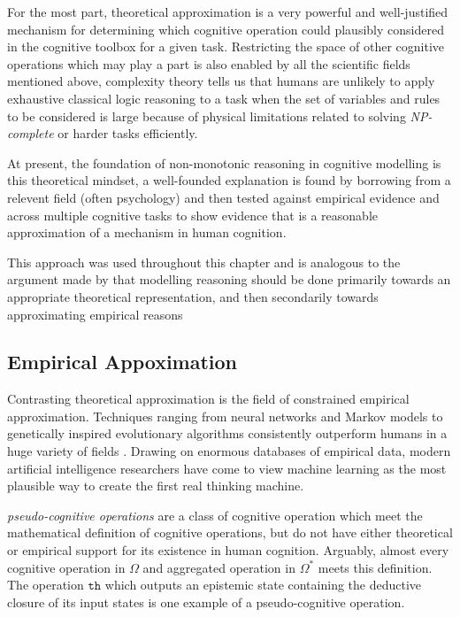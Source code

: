 {For the most part, theoretical approximation is a very powerful and well-justified mechanism for determining which cognitive operation could plausibly considered in the cognitive toolbox for a given task. Restricting the space of other cognitive operations which may play a part is also enabled by all the scientific fields mentioned above, complexity theory tells us that humans are unlikely to apply exhaustive classical logic reasoning to a task when the set of variables and rules to be considered is large because of physical limitations related to solving \textit{NP-complete} or harder tasks efficiently.

At present, the foundation of non-monotonic reasoning in cognitive modelling is this theoretical mindset, a well-founded explanation is found by borrowing from a relevent field (often psychology) and then tested against empirical evidence and across multiple cognitive tasks to show evidence that is a reasonable approximation of a mechanism in human cognition.

This approach was used throughout this chapter and is analogous to the argument made by \cite{stenning2012human} that modelling reasoning should be done primarily towards an appropriate theoretical representation, and then secondarily towards approximating empirical reasons

\subsection{Empirical Appoximation}
Contrasting theoretical approximation is the field of constrained empirical approximation. Techniques ranging from neural networks and Markov models to genetically inspired evolutionary algorithms consistently outperform humans in a huge variety of fields \citep{saad2004information}. Drawing on enormous databases of empirical data, modern artificial intelligence researchers have come to view machine learning as the most plausible way to create the first real thinking machine.

\textit{pseudo-cognitive operations} are a class of cognitive operation which meet the mathematical definition of cognitive operations, but do not have either theoretical or empirical support for its existence in human cognition. Arguably, almost every cognitive operation in $\Omega$ and aggregated operation in $\Omega^*$ meets this definition. The operation $\texttt{th}$ which outputs an epistemic state containing the deductive closure of its input states is one example of a pseudo-cognitive operation. 

}

